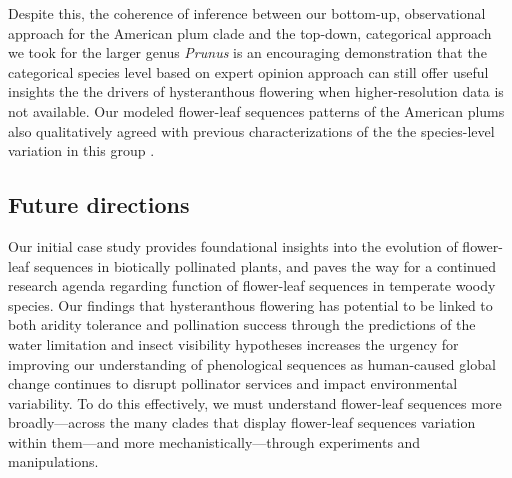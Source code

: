 \documentclass{article}[11pt]
\begin{document}
Despite this, the coherence of inference between our bottom-up, observational approach for the American plum clade and the top-down, categorical approach we took for the larger genus \emph{Prunus} is an encouraging demonstration that the categorical species level based on expert opinion approach can still offer useful insights the the drivers of hysteranthous flowering when higher-resolution data is not available. Our modeled flower-leaf sequences patterns of the American plums also qualitatively agreed with previous characterizations of the the species-level variation in this group \citep{Shaw:2004aa}. %


\subsection*{Future directions}
Our initial case study provides foundational insights into the evolution of flower-leaf sequences in biotically pollinated plants, and paves the way for a continued research agenda regarding function of flower-leaf sequences in temperate woody species. Our findings that hysteranthous flowering has potential to be linked to both aridity tolerance and  pollination success through the predictions of the water limitation and insect visibility  hypotheses increases the urgency for improving our understanding of phenological sequences as human-caused global change continues to disrupt pollinator services and impact environmental variability. To do this effectively, we must understand flower-leaf sequences more broadly---across the many clades that display flower-leaf sequences variation within them---and more mechanistically---through experiments and manipulations.

 
\end{document}

